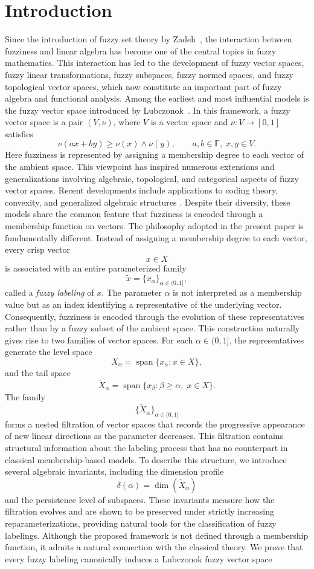 \documentclass[preprint,12pt]{elsarticle}
\theoremstyle{definition}
\begin{document}
\section{Introduction} Since the introduction of fuzzy set theory by Zadeh~\cite{zadeh1965fuzzy}, the interaction between fuzziness and linear algebra has become one of the central topics in fuzzy mathematics. This interaction has led to the development of fuzzy vector spaces, fuzzy linear transformations, fuzzy subspaces, fuzzy normed spaces, and fuzzy topological vector spaces, which now constitute an important part of fuzzy algebra and functional analysis. Among the earliest and most influential models is the fuzzy vector space introduced by Lubczonok~\cite{Lubczonok1990}. In this framework, a fuzzy vector space is a pair $(V,\nu)$, where $V$ is a vector space and $\nu:V\rightarrow[0,1]$ satisfies \[ \nu(ax+by)\ge \nu(x)\wedge \nu(y), \qquad a,b\in\mathbb F,\;x,y\in V. \] Here fuzziness is represented by assigning a membership degree to each vector of the ambient space. This viewpoint has inspired numerous extensions and generalizations involving algebraic, topological, and categorical aspects of fuzzy vector spaces. Recent developments include applications to coding theory, convexity, and generalized algebraic structures \cite{Bejines2024,Li2024,Gereme2024}. Despite their diversity, these models share the common feature that fuzziness is encoded through a membership function on vectors. The philosophy adopted in the present paper is fundamentally different. Instead of assigning a membership degree to each vector, every crisp vector \[ x\in X \] is associated with an entire parameterized family \[ \widetilde{x}=\{x_\alpha\}_{\alpha\in(0,1]}, \] called a \emph{fuzzy labeling} of $x$. The parameter $\alpha$ is not interpreted as a membership value but as an index identifying a representative of the underlying vector. Consequently, fuzziness is encoded through the evolution of these representatives rather than by a fuzzy subset of the ambient space. This construction naturally gives rise to two families of vector spaces. For each $\alpha\in(0,1]$, the representatives generate the level space \[ X_\alpha=\operatorname{span}\{x_\alpha:x\in X\}, \] and the tail space \[ \widetilde X_\alpha = \operatorname{span}\{x_\beta:\beta\ge\alpha,\;x\in X\}. \] The family \[ \{\widetilde X_\alpha\}_{\alpha\in(0,1]} \] forms a nested filtration of vector spaces that records the progressive appearance of new linear directions as the parameter decreases. This filtration contains structural information about the labeling process that has no counterpart in classical membership-based models. To describe this structure, we introduce several algebraic invariants, including the dimension profile \[ \delta(\alpha)=\dim(\widetilde X_\alpha) \] and the persistence level of subspaces. These invariants measure how the filtration evolves and are shown to be preserved under strictly increasing reparameterizations, providing natural tools for the classification of fuzzy labelings. Although the proposed framework is not defined through a membership function, it admits a natural connection with the classical theory. We prove that every fuzzy labeling canonically induces a Lubczonok fuzzy vector space 
\end{document}
